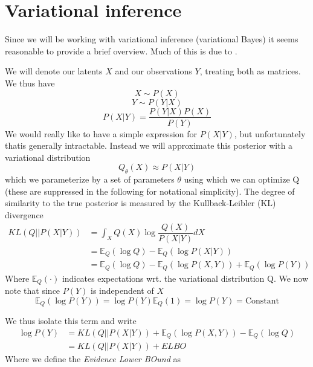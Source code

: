 \section{Variational inference}

Since we will be working with variational inference (variational Bayes) it seems reasonable to provide a brief overview. Much of this is due to \cite{mackay2003information, kingma2013auto}.

We will denote our latents $X$ and our observations $Y$, treating both as matrices.
We thus have 
\begin{equation}
X \sim P(X)
\end{equation}
\begin{equation}
Y \sim P(Y | X)
\end{equation}
\begin{equation}
P(X | Y) = \dfrac{P(Y|X) P(X)}{P(Y)}
\end{equation}
We would really like to have a simple expression for $P(X|Y)$, but unfortunately thatis generally intractable. Instead we will approximate this posterior with a variational distribution
\begin{equation}
Q_\theta (X) \approx P(X|Y)
\end{equation}
which we parameterize by a set of parameters $\theta$ using which we can optimize Q (these are suppressed in the following for notational simplicity). The degree of similarity to the true posterior is measured by the Kullback-Leibler (KL) divergence
\begin{equation}
\begin{split}
KL(Q || P(X|Y)) &= \int_X{ Q(X) \log{\dfrac{Q(X)}{P(X|Y)}}  dX}\\
			&= \mathbb{E}_Q(\log{Q}) - \mathbb{E}_Q(\log{P(X|Y)})\\
			&=\mathbb{E}_Q(\log{Q}) - \mathbb{E}_Q(\log{P(X, Y)}) + \mathbb{E}_Q(\log{P(Y)})
\end{split}
\end{equation}
Where $\mathbb{E}_Q(\cdot)$ indicates expectations wrt. the variational distribution Q.
We now note that since $P(Y)$ is independent of $X$
\begin{equation}
\mathbb{E}_Q(\log{P(Y)}) = \log{P(Y)} \mathbb{E}_Q(1) =  \log{P(Y)} = \text{Constant}
\end{equation}

We thus isolate this term and write
\begin{equation}
\begin{split}
\log{P(Y)} &= KL(Q || P(X|Y)) + \mathbb{E}_Q(\log{P(X, Y)}) - \mathbb{E}_Q(\log{Q})\\
		&= KL(Q || P(X|Y)) + ELBO
\end{split}
\end{equation}
Where we define the \textit{Evidence Lower BOund} as 

